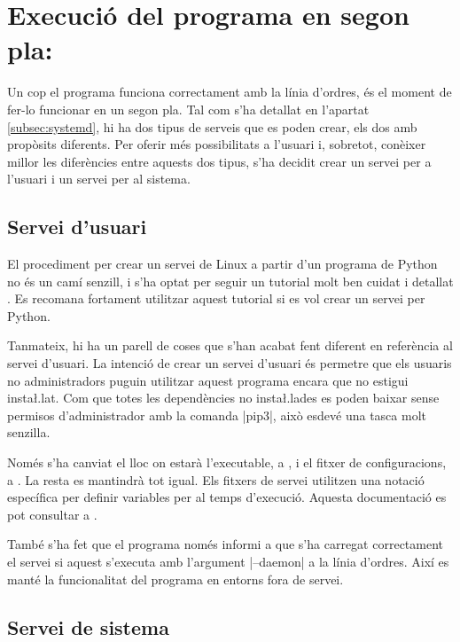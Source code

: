 \section{Execució del programa en segon pla: }

Un cop el programa funciona correctament amb la línia d'ordres, és el moment
de fer-lo funcionar en un segon pla. Tal com s'ha detallat en l'apartat
\ref{subsec:systemd}, hi ha dos tipus de serveis que es poden crear, els dos
amb propòsits diferents. Per oferir més possibilitats a l'usuari i, sobretot,
conèixer millor les diferències entre aquests dos tipus, s'ha decidit crear
un servei per a l'usuari i un servei per al sistema.

\subsection{Servei d'usuari}

El procediment per crear un servei de Linux a partir d'un programa de Python
no és un camí senzill, i s'ha optat per seguir un tutorial molt ben cuidat i
detallat \cite{PythonSystemdTutorial}. Es recomana fortament utilitzar aquest
tutorial si es vol crear un servei per Python.

Tanmateix, hi ha un parell de coses que s'han acabat fent diferent en referència
al servei d'usuari. La intenció de crear un servei d'usuari és permetre que els
usuaris no administradors puguin utilitzar aquest programa encara que no estigui
insta\l.lat. Com que totes les dependències no insta\l.lades es poden baixar
sense permisos d'administrador amb la comanda \ord|pip3|, això esdevé una tasca
molt senzilla.

Només s'ha canviat el lloc on estarà l'executable, a , i el
fitxer de configuracions, a . La resta es mantindrà
tot igual. Els fitxers de servei utilitzen una notació específica per
definir variables per al temps d'execució. Aquesta documentació es pot consultar
a \cite{mansystemd}.

També s'ha fet que el programa només informi a  que s'ha carregat
correctament el servei si aquest s'executa amb l'argument \ord|--daemon| a la
línia d'ordres. Així es manté la funcionalitat del programa en entorns fora
de servei.

\subsection{Servei de sistema}
\label{subsec:systemd_system}

